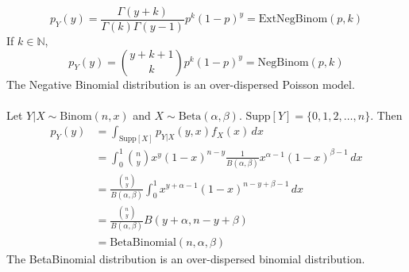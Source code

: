 \documentclass[12pt]{article}
\newcommand{\supp}[1]{\text{Supp}[ #1 ]}
\newcommand{\set}[1]{\Big\{ #1 \Big\}}
\begin{document}
$$ p_Y(y) = \frac{\Gamma(y+k)}{\Gamma(k)\Gamma(y-1)}p^k(1 - p)^y = \text{ExtNegBinom}(p,k)  $$ 
If $k \in \mathbb{N}$, $$ p_Y(y) = \binom{y+k+1}{k}p^k(1 - p)^y = \text{NegBinom}(p,k) $$ 
The Negative Binomial distribution is an over-dispersed Poisson model.  \\~\\
Let $Y|X \sim \text{Binom}(n,x)$ and $X \sim \text{Beta}(\alpha, \beta)$. $\supp{Y} = \set{0, 1, 2, \dots, n}$. Then $$ \begin{aligned} 
p_Y(y) &= \int_{\supp{X}} p_{Y|X}(y,x) f_X(x) \, dx \\ &= \int_0^1 \binom{n}{y}x^y(1 - x)^{n - y} \frac{1}{B(\alpha,\beta)} x^{\alpha - 1} (1 - x)^{\beta - 1} \, dx \\ &= \frac{\binom{n}{y}}{B(\alpha, \beta)}\int_0^1 x^{y + \alpha - 1}(1 - x)^{n - y + \beta - 1} \, dx \\ &= \frac{\binom{n}{y}}{B(\alpha, \beta)}B(y+\alpha, n - y + \beta) \\ &= \text{BetaBinomial}(n,\alpha,\beta) \end{aligned} $$ 
The BetaBinomial distribution is an over-dispersed binomial distribution. \\~\\
\end{document}
